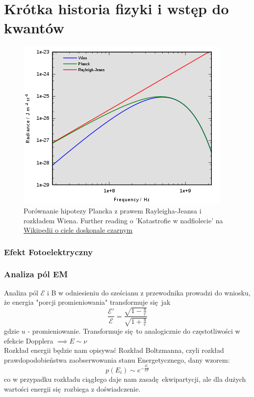 \documentclass[12pt,a4paper]{report}
\newcommand{\ind}[1]{{\color{blue} #1\index{#1}}}
\newcommand{\link}[2]{{\color{cyan} \href{#1}{#2}}}
\newcommand{\E}{\mathcal{E}}
\newenvironment{lecture}[1]{\par\medskip
   \noindent\chapter{#1} \rmfamily}{\medskip}
\begin{document}
\begin{lecture}{Krótka historia fizyki i wstęp do kwantów}
    \begin{figure}[!ht]
        \centering
        \includegraphics[width=\linewidth]{Wyk_1_Rys_6.png}
        \caption{Porównanie hipotezy Plancka z prawem Rayleigha-Jeansa i rozkładem Wiena. Further reading o 'Katastrofie w nadfiolecie'  na \link{https://pl.wikipedia.org/wiki/Ciało_doskonale_czarne}{Wikipedii o ciele doskonale czarnym}}
        \label{lec_1:fig:cialo_doskonale_czarne_porownanie}
    \end{figure}
    
    \subsection{Efekt Fotoelektryczny}
    \subsection{Analiza pól EM}
    Analiza pól $\E$ i B w odniesieniu do sześcianu z przewodnika prowadzi do wniosku, że energia "porcji promieniowania" transformuje się jak 
    \[\frac{\E'}{\E} = \frac{\sqrt{1 - \frac{u}{c}}}{\sqrt{1 + \frac{u}{c}}}\]
    gdzie $u$ - promieniowanie.
    Transformuje się to analogicznie do częstotliwości w efekcie Dopplera $\implies E \sim \nu$
    \\
    Rozkład energii będzie nam opisywać \ind{Rozkład Boltzmanna}, czyli rozkład prawdopodobieństwa zaobserwowania stanu Energetycznego, dany wzorem:
    \[p(E_i) \sim e^{-\frac{E_i}{k T}}\]
    co w przypadku rozkładu ciągłego daje nam zasadę ekwipartycji, ale dla dużych wartości energii się rozbiega z doświadczenie.
    

\end{lecture}
\end{document}
